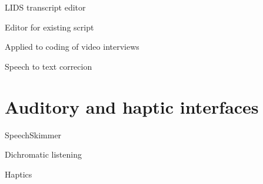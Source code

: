 LIDS transcript editor \citep{Apperley2002}

Editor for existing script \citep{Shin2016}

Applied to coding of video interviews \cite{Chandrasegaran2017}

Speech to text correcion 
\citep{Burke2006}
\citep{Liang2014}
\citep{Suhm2001}
\citep{Wald2007}







\section{Auditory and haptic interfaces}\label{sec:background-auditory}

SpeechSkimmer \citep{Arons1997}

Dichromatic listening \citep{Ranjan2006}

Haptics
\citep{Metatla2016}

